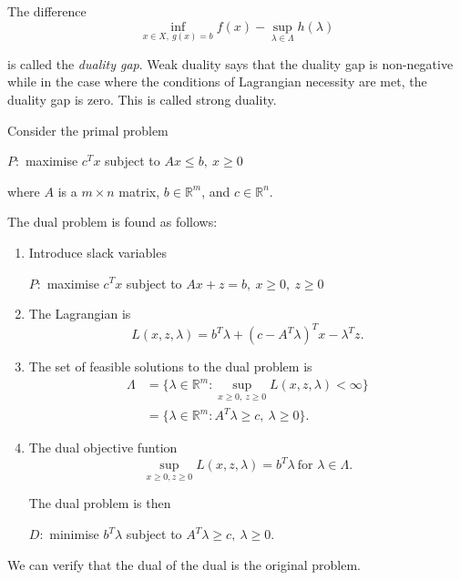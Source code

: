 \documentclass[a4paper]{article}
\begin{document}
The difference
\[
  \inf_{x \in X,\: g(x) = b} f(x) - \sup_{\lambda \in \Lambda} h(\lambda)
\]

is called the \emph{duality gap}. Weak duality says that the duality gap is non-negative while in the case where the conditions of Lagrangian necessity are met, the duality gap is zero. This is called strong duality.

\begin{eg}
  Consider the primal problem
  \begin{center}
    $P:$ maximise $c^T x$ subject to $Ax \leq b,\: x \geq 0$
  \end{center}
  where $A$ is a $m \times n$ matrix, $b \in \mathbb{R}^m$, and $c \in \mathbb{R}^n$.

  The dual problem is found as follows:
  \begin{enumerate}
  \item Introduce slack variables
    \begin{center}
      $P:$ maximise $c^T x$ subject to $Ax + z = b, \: x \geq 0, \: z \geq 0$
    \end{center}
  \item The Lagrangian is
    \[
      L(x, z, \lambda) = b^T \lambda + (c - A^T \lambda)^T x - \lambda ^T z.
    \]
  \item The set of feasible solutions to the dual problem is
    \begin{align*}
      \Lambda &= \{\lambda \in \mathbb{R}^m: \sup_{x \geq 0,\: z \geq 0} L(x, z, \lambda) < \infty \} \\
              &= \{\lambda \in \mathbb{R}^m: A^T \lambda \geq c,\: \lambda \geq 0\}.
    \end{align*}
  \item The dual objective funtion
    \[
      \sup_{x \geq 0, z \geq 0} L(x, z, \lambda) = b^T \lambda \: \text{for } \lambda \in \Lambda.
    \]

    The dual problem is then

    \begin{center}
      $D:$ minimise $b^T \lambda$ subject to $A^T \lambda \geq c,\: \lambda \geq 0$.
    \end{center}
  \end{enumerate}
\end{eg}

We can verify that the dual of the dual is the original problem.
\end{document}

